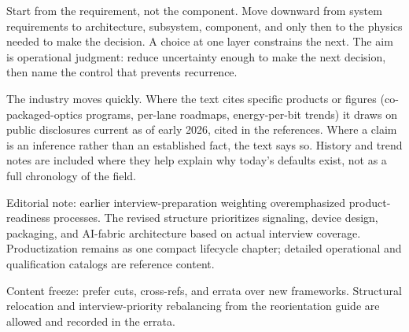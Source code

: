 Start from the requirement, not the component. Move downward from system
requirements to architecture, subsystem, component, and only then to the
physics needed to make the decision. A choice at one layer constrains the next.
The aim is operational judgment: reduce uncertainty enough to make the next
decision, then name the control that prevents recurrence.

 The industry moves quickly. Where the text cites specific
products or figures (co-packaged-optics programs, per-lane roadmaps, energy-per-bit
trends) it draws on public disclosures current as of early 2026, cited in the
references. Where a claim is an inference rather than an established fact, the text
says so. History and trend notes are included where they help explain why today's
defaults exist, not as a full chronology of the field.


Editorial note: earlier interview-preparation weighting overemphasized
product-readiness processes. The revised structure prioritizes signaling, device
design, packaging, and AI-fabric architecture based on actual interview coverage.
Productization remains as one compact lifecycle chapter; detailed operational and
qualification catalogs are reference content.

Content freeze: prefer cuts, cross-refs, and errata over new frameworks. Structural
relocation and interview-priority rebalancing from the reorientation guide are
allowed and recorded in the errata.
